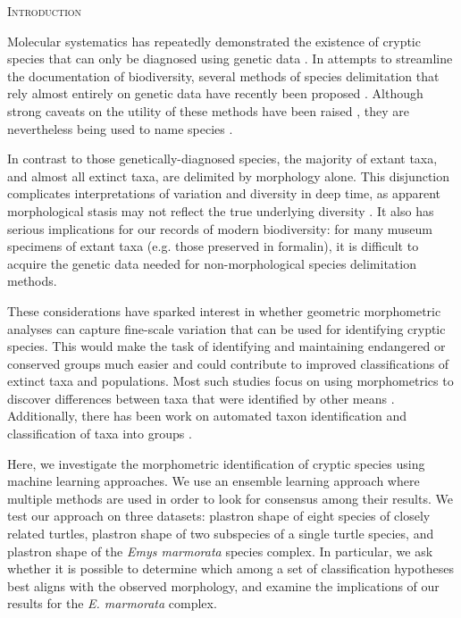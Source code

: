 \documentclass[12pt,letterpaper]{article}
\renewcommand{\section}[1]{%
\bigskip
\begin{center}
\begin{Large}
\normalfont\scshape #1
\medskip
\end{Large}
\end{center}}
\begin{document}
\section{Introduction}
Molecular systematics has repeatedly demonstrated the existence of cryptic species that can only be diagnosed using genetic data \citep{Stuart2006,Bickford2007,SchlickSteiner2007,Pfenninger2007,Clare2011,Funk2012}. In attempts to streamline the documentation of biodiversity, several methods of species delimitation that rely almost entirely on genetic data have recently been proposed \citep{Pons2006,Carstens2010,Hausdorf2010,O'Meara2010,Yang2010b,Huelsenbeck2011b}. Although strong caveats on the utility of these methods have been raised \citep{Bauer2000,Carstens2013}, they are nevertheless being used to name species \citep{Leache2010,Spinks2014}.

In contrast to those genetically-diagnosed species, the majority of extant taxa, and almost all extinct taxa, are delimited by morphology alone. This disjunction complicates interpretations of variation and diversity in deep time, as apparent morphological stasis may not reflect the true underlying diversity \citep{Eldredge1972,Gould1977a,VanBocxlaer2013}. It also has serious implications for our records of modern biodiversity: for many museum specimens of extant taxa (e.g. those preserved in formalin), it is difficult to acquire the genetic data needed for non-morphological species delimitation methods.

These considerations have sparked interest in whether geometric morphometric analyses can capture fine-scale variation that can be used for identifying cryptic species. This would make the task of identifying and maintaining endangered or conserved groups much easier and could contribute to improved classifications of extinct taxa and populations. Most such studies focus on using morphometrics to discover differences between taxa that were identified by other means \citep{Polly2003,Zelditch2004,Gaubert2005b,Gunduz2007,Polly2007a,Demandt2009,Markolf2013,Fruciano2016}. Additionally, there has been work on automated taxon identification and classification of taxa into groups \citep{Baylac2003,Dobigny2003,MacLeod2007,VandenBrink2011,Vitek2017}. 

Here, we investigate the morphometric identification of cryptic species using machine learning approaches. We use an ensemble learning approach where multiple methods are used in order to look for consensus among their results. We test our approach on three datasets: plastron shape of eight species of closely related turtles, plastron shape of two subspecies of a single turtle species, and plastron shape of the \textit{Emys marmorata} species complex. In particular, we ask whether it is possible to determine which among a set of classification hypotheses best aligns with the observed morphology, and examine the implications of our results for the \textit{E. marmorata} complex. 
\end{document}
